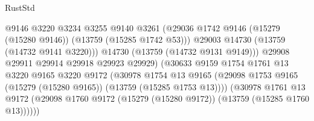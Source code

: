 \begin{lexlean}{RustStd}
\begin{coremodule}
                                              @9146
                                              @3220
                                              @3234
                                              @3255
                                              @9140
                                              @3261
                                              (@29036
                                                @1742
                                                @9146
                                                (@15279 (@15280 @9146))
                                                (@13759 (@15285 @1742 @53)))
                                              @29003
                                              @14730
                                              (@13759 (@14732 @9141 @3220)))
                                            @14730
                                            (@13759 (@14732 @9131 @9149)))
                                          @29908
                                          @29911
                                          @29914
                                          @29918
                                          @29923
                                          @29929)
                                        (@30633
                                          @9159
                                          @1754
                                          @1761
                                          @13
                                          @3220
                                          @9165
                                          @3220
                                          @9172
                                          (@30978
                                            @1754
                                            @13
                                            @9165
                                            (@29098
                                              @1753
                                              @9165
                                              (@15279 (@15280 @9165))
                                              (@13759 (@15285 @1753 @13))))
                                          (@30978
                                            @1761
                                            @13
                                            @9172
                                            (@29098
                                              @1760
                                              @9172
                                              (@15279 (@15280 @9172))
                                              (@13759 (@15285 @1760 @13))))))

\end{coremodule}
\end{lexlean}
